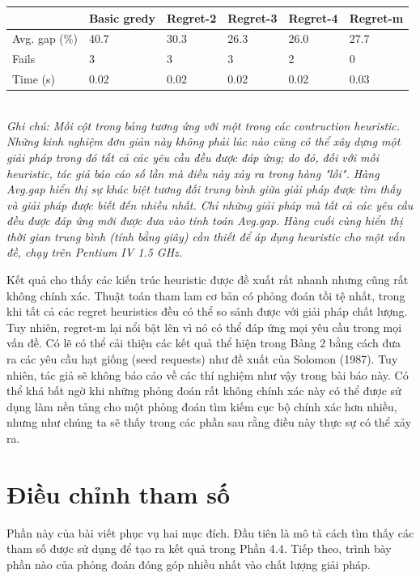 \begin{table}[caption={Performance of Construction Heuristics}, label=tab:2]
    \begin{tabular}{@{}llllll@{}}
        \toprule
                      & Basic gredy & Regret-2 & Regret-3 & Regret-4 & Regret-m \\ \midrule
        Avg. gap (\%) & 40.7        & 30.3     & 26.3     & 26.0     & 27.7     \\
        Fails         & 3           & 3        & 3        & 2        & 0        \\
        Time (s)      & 0.02        & 0.02     & 0.02     & 0.02     & 0.03     \\ \bottomrule
        \end{tabular} \\
        \justify
        \textit{Ghi chú: Mỗi cột trong bảng tương ứng với một trong các contruction heuristic. Những kinh nghiệm đơn giản này không phải lúc nào cũng có thể xây dựng một giải pháp trong đó tất cả các yêu cầu đều được đáp ứng; do đó, đối với mỗi heuristic, tác giả báo cáo số lần mà điều này xảy ra trong hàng "lỗi". Hàng Avg.gap hiển thị sự khác biệt tương đối trung bình giữa giải pháp được tìm thấy và giải pháp được biết đến nhiều nhất. Chỉ những giải pháp mà tất cả các yêu cầu đều được đáp ứng mới được đưa vào tính toán Avg.gap. Hàng cuối cùng hiển thị thời gian trung bình (tính bằng giây) cần thiết để áp dụng heuristic cho một vấn đề, chạy trên Pentium IV 1.5 GHz.}
\end{table}

Kết quả cho thấy các kiến trúc heuristic được đề xuất rất nhanh nhưng cũng rất không chính xác. Thuật toán tham lam cơ bản có phỏng đoán tồi tệ nhất, trong khi tất cả các regret heuristics đều có thể so sánh được với giải pháp chất lượng. Tuy nhiên, regret-m lại nổi bật lên vì nó có thể đáp ứng mọi yêu cầu trong mọi vấn đề. Có lẽ có thể cải thiện các kết quả thể hiện trong Bảng 2 bằng cách đưa ra các yêu cầu hạt giống (seed requests) như đề xuất của Solomon (1987). Tuy nhiên, tác giả sẽ không báo cáo về các thí nghiệm như vậy trong bài báo này. Có thể khá bất ngờ khi những phỏng đoán rất không chính xác này có thể được sử dụng làm nền tảng cho một phỏng đoán tìm kiếm cục bộ chính xác hơn nhiều, nhưng như chúng ta sẽ thấy trong các phần sau rằng điều này thực sự có thể xảy ra.


\section{Điều chỉnh tham số}
Phần này của bài viết phục vụ hai mục đích. Đầu tiên là mô tả cách tìm thấy các tham số được sử dụng để tạo ra kết quả trong Phần 4.4. Tiếp theo, trình bày phần nào của phỏng đoán đóng góp nhiều nhất vào chất lượng giải pháp.

